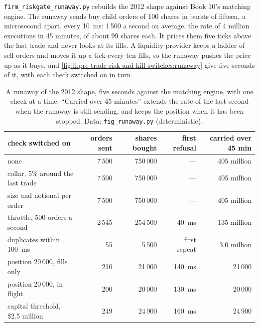 \texttt{firm\_riskgate\_runaway.py} rebuilds the 2012 shape against Book 10's matching engine. The runaway sends buy child orders
of 100 shares in bursts of fifteen, a microsecond apart, every \qty{10}{\milli\second}: 1\,500 a second on average, the rate
of 4 million executions in 45 minutes, of about 99 shares each. It prices them five ticks above the last trade and never looks
at its fills. A liquidity provider keeps a ladder of sell orders and moves it up a tick every ten fills, so the runaway pushes
the price up as it buys.  and
\cref{fig:ll:pre-trade-risk-and-kill-switches:runaway} give five seconds of it, with each check switched on in turn.

\begin{table}[ht]
\centering\small
\begin{tabular}{lrrrr}
\toprule
check switched on & orders sent & shares bought & first refusal & carried over 45 min \\
\midrule
none & 7\,500 & 750\,000 & --- & 405 million \\
collar, 5\% around the last trade & 7\,500 & 750\,000 & --- & 405 million \\
size and notional per order & 7\,500 & 750\,000 & --- & 405 million \\
throttle, 500 orders a second & 2\,545 & 254\,500 & \qty{40}{\milli\second} & 135 million \\
duplicates within \qty{100}{\milli\second} & 55 & 5\,500 & first repeat & 3.0 million \\
position 20\,000, fills only & 210 & 21\,000 & \qty{140}{\milli\second} & 21\,000 \\
position 20\,000, in flight & 200 & 20\,000 & \qty{130}{\milli\second} & 20\,000 \\
capital threshold, \$2.5 million & 249 & 24\,900 & \qty{160}{\milli\second} & 24\,900 \\
\bottomrule
\end{tabular}
\caption{A runaway of the 2012 shape, five seconds against the matching engine, with one check at a time. ``Carried over
45 minutes'' extends the rate of the last second when the runaway is still sending, and keeps the position when it has been
stopped. Data: \texttt{fig\_runaway.py} (deterministic).}\label{tab:ll:pre-trade-risk-and-kill-switches:runaway}
\end{table}

